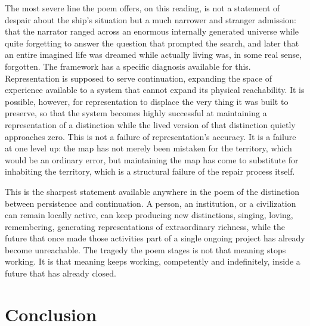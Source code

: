 \documentclass[11pt]{article}
\begin{document}
The most severe line the poem offers, on this reading, is not a statement of despair about the ship's situation but a much narrower and stranger admission: that the narrator ranged across an enormous internally generated universe while quite forgetting to answer the question that prompted the search, and later that an entire imagined life was dreamed while actually living was, in some real sense, forgotten. The framework has a specific diagnosis available for this. Representation is supposed to serve continuation, expanding the space of experience available to a system that cannot expand its physical reachability. It is possible, however, for representation to displace the very thing it was built to preserve, so that the system becomes highly successful at maintaining a representation of a distinction while the lived version of that distinction quietly approaches zero. This is not a failure of representation's accuracy. It is a failure at one level up: the map has not merely been mistaken for the territory, which would be an ordinary error, but maintaining the map has come to substitute for inhabiting the territory, which is a structural failure of the repair process itself.

This is the sharpest statement available anywhere in the poem of the distinction between persistence and continuation. A person, an institution, or a civilization can remain locally active, can keep producing new distinctions, singing, loving, remembering, generating representations of extraordinary richness, while the future that once made those activities part of a single ongoing project has already become unreachable. The tragedy the poem stages is not that meaning stops working. It is that meaning keeps working, competently and indefinitely, inside a future that has already closed.

\section{Conclusion}
\end{document}
